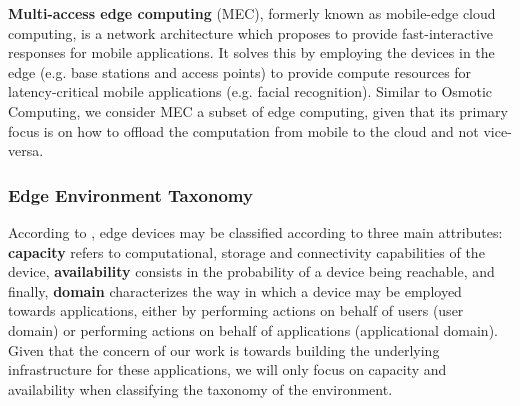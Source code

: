 \textbf{Multi-access edge computing} \cite{mobile_edge_cloud} (MEC), formerly known as mobile-edge cloud computing, is a network architecture which proposes to provide fast-interactive responses for mobile applications. It solves this by employing the devices in the edge (e.g. base stations and access points) to provide compute resources for latency-critical mobile applications (e.g. facial recognition). Similar to Osmotic Computing, we consider MEC a subset of edge computing, given that its primary focus is on how to offload the computation from mobile to the cloud and not vice-versa. 

\subsubsection{Edge Environment Taxonomy} \label{subsec:edge_taxonomy}

According to \textcite{Leitao2018}, edge devices may be classified according to three main attributes: \textbf{capacity} refers to computational, storage and connectivity capabilities of the device,  \textbf{availability} consists in the probability of a device being reachable, and finally, \textbf{domain} characterizes the way in which a device may be employed towards applications, either by performing actions on behalf of users (user domain) or performing actions on behalf of applications (applicational domain). Given that the concern of our work is towards building the underlying infrastructure for these applications, we will only focus on capacity and availability when classifying the taxonomy of the environment. 

